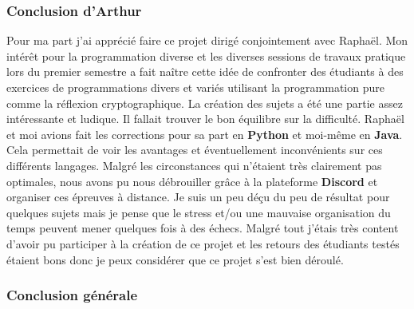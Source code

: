 \documentclass[12pt]{article}
\begin{document}
\subsubsection{Conclusion d'Arthur}
\enlargethispage{3\baselineskip}
Pour ma part j'ai apprécié faire ce projet dirigé conjointement avec Raphaël. Mon intérêt pour la programmation diverse et les diverses sessions de travaux pratique lors du premier semestre a fait naître cette idée de confronter des étudiants à des exercices de programmations divers et variés utilisant la programmation pure comme la réflexion cryptographique. La création des sujets a été une partie assez intéressante et ludique. Il fallait trouver le bon équilibre sur la difficulté. Raphaël et moi avions fait les corrections pour sa part en \textbf{Python} et moi-même en \textbf{Java}. Cela permettait de voir les avantages et éventuellement inconvénients sur ces différents langages. Malgré les circonstances qui n'étaient très clairement pas optimales, nous avons pu nous débrouiller grâce à la plateforme \textbf{Discord} et organiser ces épreuves à distance. Je suis un peu déçu du peu de résultat pour quelques sujets mais je pense que le stress et/ou une mauvaise organisation du temps peuvent mener quelques fois à des échecs. 
Malgré tout j'étais très content d'avoir pu participer à la création de ce projet et les retours des étudiants testés étaient bons donc je peux considérer que ce projet s'est bien déroulé.

\subsubsection{Conclusion générale}
\end{document}
